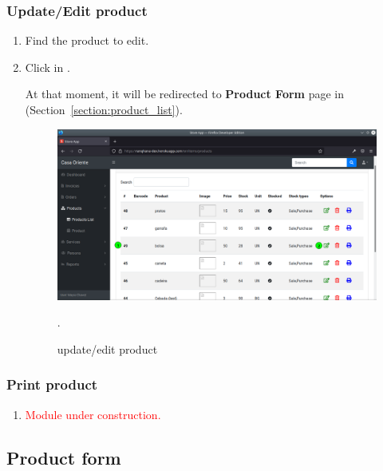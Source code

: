 \documentclass[a4paper,11pt]{refart}
\newcommand\InConstruction{\textcolor{red}{Module under construction.}}
\begin{document}
\subsubsection{Update/Edit product}
\begin{enumerate}
	\item Find the product to edit.
	\item Click in .
	\medskip
	\begin{leftbar}
	 At that moment, it will be redirected to \textbf{Product Form} page in (Section~\ref{section:product_list}).
	\end{leftbar}
	\begin{figure}[H]\centering
		\includegraphics[width=\textwidth]{images/produc_list-update.png}
		\caption{update/edit product}
		\label{fig:produc_list-update.png}.
	\end{figure}
\end{enumerate}

\subsubsection{Print product}
\begin{enumerate}
	\item \InConstruction{}
\end{enumerate}

\subsection{Product form}\label{section:product_form}
\end{document}
